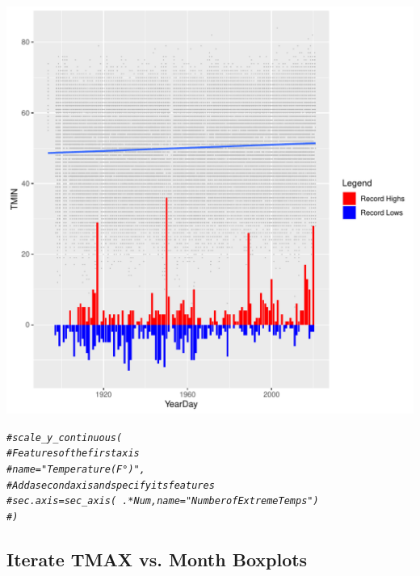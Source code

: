 \documentclass{article}\usepackage[]{graphicx}\usepackage[]{color}
\makeatletter
\def\maxwidth{ %
  \ifdim\Gin@nat@width>\linewidth
    \linewidth
  \else
    \Gin@nat@width
  \fi
}
\newcommand{\hlcom}[1]{\textcolor[rgb]{0.678,0.584,0.686}{\textit{#1}}}%
\newenvironment{kframe}{%
 \def\at@end@of@kframe{}%
 \ifinner\ifhmode%
  \def\at@end@of@kframe{\end{minipage}}%
  \begin{minipage}{\columnwidth}%
 \fi\fi%
 \def\FrameCommand##1{\hskip\@totalleftmargin \hskip-\fboxsep
 \colorbox{shadecolor}{##1}\hskip-\fboxsep
     \hskip-\linewidth \hskip-\@totalleftmargin \hskip\columnwidth}%
 \MakeFramed {\advance\hsize-\width
   \@totalleftmargin\z@ \linewidth\hsize
   \@setminipage}}%
 {\par\unskip\endMakeFramed%
 \at@end@of@kframe}
\newenvironment{knitrout}{}{} %
\makeatother
\begin{document}
\begin{knitrout}
\begin{kframe}
{\ttfamily\noindent\itshape{}}

{\ttfamily\noindent\color{warningcolor}{\#\# Warning: Removed 539 rows containing non-finite values (stat\_smooth).}}

{\ttfamily\noindent\color{warningcolor}{\#\# Warning: Removed 539 rows containing missing values (geom\_point).}}

{\ttfamily\noindent\color{warningcolor}{\#\# Warning: Removed 4 rows containing missing values (geom\_bar).}}\end{kframe}
\includegraphics[width=\maxwidth]{figure/unnamed-chunk-14-1} 
\begin{kframe}\begin{alltt}
\hlcom{#scale_y_continuous(}
    \hlcom{# Features of the first axis}
    \hlcom{# name = "Temperature (F °)",}
    \hlcom{# Add a second axis and specify its features}
    \hlcom{# sec.axis = sec_axis(~.*Num, name="Number of Extreme Temps")}
  \hlcom{#) }
\end{alltt}
\end{kframe}
\end{knitrout}


\subsection{Iterate TMAX vs. Month Boxplots}
\end{document}
